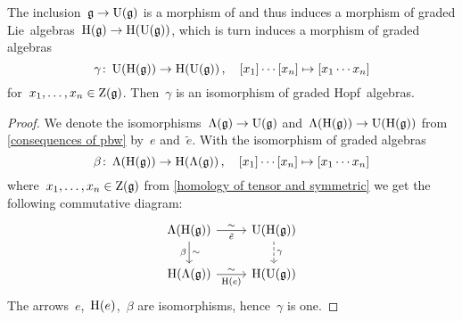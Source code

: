 \documentclass[a4paper,10pt,headings=standardclasses]{scrartcl}
\begin{document}
\begin{corollary}
  The inclusion~$\mathfrak{g} \to \operatorname{U}(\mathfrak{g})$ is a morphism of {\dgl} and thus induces a morphism of graded Lie~algebras~$\operatorname{H}(\mathfrak{g}) \to \operatorname{H}(\operatorname{U}(\mathfrak{g}))$, which is turn induces a morphism of graded algebras
  \[
    \gamma
    \colon
    \operatorname{U}(\operatorname{H}(\mathfrak{g}))
    \to
    \operatorname{H}(\operatorname{U}(\mathfrak{g})) \,,
    \quad
    [x_1] \dotsm [x_n]
    \mapsto
    [x_1 \dotsm x_n]
  \]
  for~$x_1, \dotsc, x_n \in \operatorname{Z}(\mathfrak{g})$.
  Then~$\gamma$ is an isomorphism of graded Hopf~algebras.
\end{corollary}

\begin{proof}
  We denote the isomorphisms~$\operatorname{\Lambda}(\mathfrak{g}) \to \operatorname{U}(\mathfrak{g})$ and~$\operatorname{\Lambda}(\operatorname{H}(\mathfrak{g})) \to \operatorname{U}(\operatorname{H}(\mathfrak{g}))$ from \cref{consequences of pbw} by~$e$ and~$\tilde{e}$.
  With the isomorphism of graded algebras
  \[
    \beta
    \colon
    \operatorname{\Lambda}(\operatorname{H}(\mathfrak{g}))
    \to
    \operatorname{H}(\operatorname{\Lambda}(\mathfrak{g})) \,,
    \quad
    [x_1] \dotsm [x_n]
    \mapsto
    [x_1 \dotsm x_n]
  \]
  where~$x_1, \dotsc, x_n \in \operatorname{Z}(\mathfrak{g})$ from \cref{homology of tensor and symmetric} we get the following commutative diagram:
  \[
    \begin{tikzcd}
      \dgSymm(\homology(\glie))
      \arrow{r}[below]{\tilde{e}}[above]{\sim}
      \arrow{d}[left]{\beta}[right]{\sim}
      &
      \Univ(\homology(\glie))
      \arrow[dashed]{d}[right]{\gamma}
      \\
      \homology(\dgSymm(\glie))
      \arrow{r}[below]{\homology(e)}[above]{\sim}
      &
      \homology(\Univ(\glie))
    \end{tikzcd}
  \]
  The arrows~$e$,~$\operatorname{H}(e)$,~$\beta$ are isomorphisms, hence~$\gamma$ is one.
\end{proof}
\end{document}
